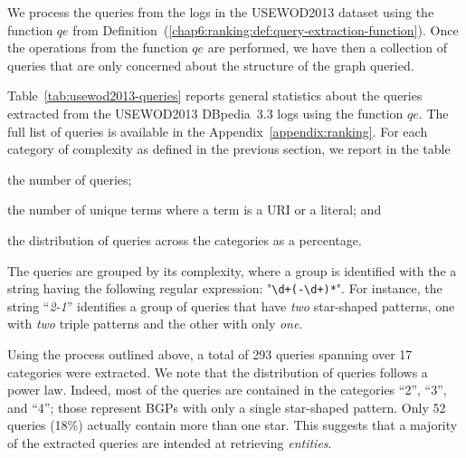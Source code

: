 We process the queries from the logs in the USEWOD2013 dataset using the function $qe$ from Definition~(\ref{chap6:ranking:def:query-extraction-function}).
Once the operations from the function $qe$ are performed, we have then a collection of queries that are only concerned about the structure of the graph queried.

Table~\ref{tab:usewod2013-queries} reports general statistics about the queries extracted from the USEWOD2013 DBpedia~3.3 logs using the function $qe$. The full list of queries is available in the Appendix~\ref{appendix:ranking}. For each category of complexity as defined in the previous section, we report in the table
\begin{inparaenum}[(a)]
\item the number of queries;
\item the number of unique terms where a term is a URI or a literal; and
\item the distribution of queries across the categories as a percentage.
\end{inparaenum}

The queries are grouped by its complexity, where a group is identified with the a string having the following regular expression: "\verb/\d+(-\d+)*/". For instance, the string ``\emph{2-1}'' identifies a group of queries that have \textit{two} star-shaped patterns, one with \textit{two} triple patterns and the other with only \textit{one}.

Using the process outlined above, a total of 293 queries spanning over 17 categories were extracted. We note that the distribution of queries follows a power law. Indeed, most of the queries are contained in the categories ``2'', ``3'', and ``4''; those represent BGPs with only a single star-shaped pattern. Only 52 queries (18\%) actually contain more than one star. This suggests that a majority of the extracted queries are intended at retrieving \emph{entities}.

